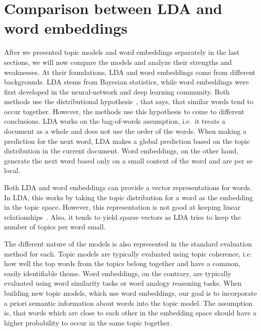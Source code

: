 \documentclass[
        a4paper,
        titlepage,
        twoside,
        parskip
        ]{scrbook}
\theoremstyle{break}
\begin{document}
\section{Comparison between LDA and word embeddings}

After we presented topic models and word embeddings separately in the last sections, we will now compare the models and analyze their strengths and weaknesses.
At their foundations, LDA and word embeddings come from different backgrounds.
LDA stems from Bayesian statistics, while word embeddings were first developed in the neural-network and deep learning community.
Both methods use the distributional hypothesis~\cite{Firth1957}, that says, that similar words tend to occur together.
However, the methods use this hypothesis to come to different conclusions.
LDA works on the bag-of-words assumption, i.e.\ it treats a document as a whole and does not use the order of the words.
When making a prediction for the next word, LDA makes a global prediction based on the topic distribution in the current document.
Word embeddings, on the other hand, generate the next word based only on a small context of the word and are per se local.

Both LDA and word embeddings can provide a vector representations for words.
In LDA, this works by taking the topic distribution for a word as the embedding in the topic space.
However, this representation is not good at keeping linear relationships~\cite{Mikolov2013b,Mikolov2013a}.
Also, it tends to yield sparse vectors as LDA tries to keep the number of topics per word small.

The different nature of the models is also represented in the standard evaluation method for each.
Topic models are typically evaluated using topic coherence, i.e. how well the top words from the topics belong together and have a common, easily identifiable theme.
Word embeddings, on the contrary, are typically evaluated using word similarity tasks or word analogy reasoning tasks.
When building new topic models, which use word embeddings, our goal is to incorporate a priori semantic information about words into the topic model.
The assumption is, that words which are close to each other in the embedding space should have a higher probability to occur in the same topic together.
\end{document}
